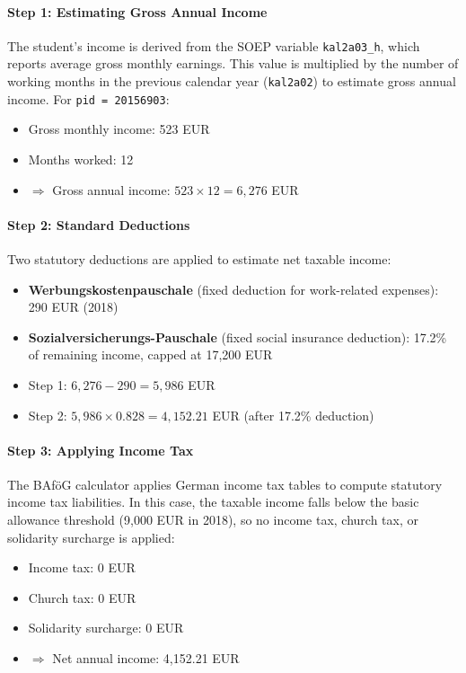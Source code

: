 \paragraph{Step 1: Estimating Gross Annual Income}  
The student’s income is derived from the SOEP variable \texttt{kal2a03\_h}, which reports average gross monthly earnings. This value is multiplied by the number of working months in the previous calendar year (\texttt{kal2a02}) to estimate gross annual income.  
For \texttt{pid = 20156903}:
\begin{itemize}
    \item Gross monthly income: 523 EUR
    \item Months worked: 12
    \item $\Rightarrow$ Gross annual income: $523 \times 12 = 6{,}276$ EUR
\end{itemize}

\paragraph{Step 2: Standard Deductions}  
Two statutory deductions are applied to estimate net taxable income:
\begin{itemize}
    \item \textbf{Werbungskostenpauschale} (fixed deduction for work-related expenses): 290 EUR (2018)
    \item \textbf{Sozialversicherungs-Pauschale} (fixed social insurance deduction): 17.2\% of remaining income, capped at 17,200 EUR
\end{itemize}

\begin{itemize}
    \item Step 1: $6{,}276 - 290 = 5{,}986$ EUR
    \item Step 2: $5{,}986 \times 0.828 = 4{,}152.21$ EUR (after 17.2\% deduction)
\end{itemize}

\paragraph{Step 3: Applying Income Tax}
The BAföG calculator applies German income tax tables to compute statutory income tax liabilities. In this case, the taxable income falls below the basic allowance threshold (9,000 EUR in 2018), so no income tax, church tax, or solidarity surcharge is applied:
\begin{itemize}
    \item Income tax: 0 EUR
    \item Church tax: 0 EUR
    \item Solidarity surcharge: 0 EUR
    \item $\Rightarrow$ Net annual income: 4,152.21 EUR
\end{itemize}

